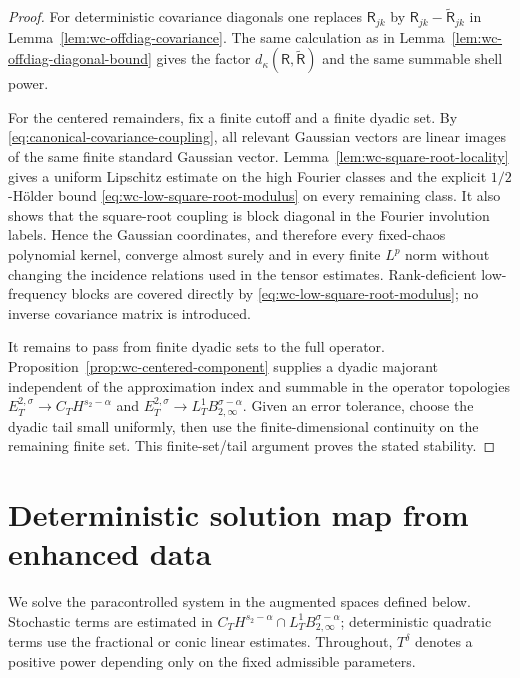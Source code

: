 \documentclass[10pt]{amsart}
\numberwithin{equation}{section}
\theoremstyle{plain}
\theoremstyle{definition}
\theoremstyle{remark}
\begin{document}
\begin{proof}
For deterministic covariance diagonals one replaces \(\mathsf R_{jk}\) by \(\mathsf R_{jk}-\widetilde{\mathsf R}_{jk}\) in Lemma~\ref{lem:wc-offdiag-covariance}.  The same calculation as in Lemma~\ref{lem:wc-offdiag-diagonal-bound} gives the factor \(d_\kappa(\mathsf R,\widetilde{\mathsf R})\) and the same summable shell power.

For the centered remainders, fix a finite cutoff and a finite dyadic set.  By \eqref{eq:canonical-covariance-coupling}, all relevant Gaussian vectors are linear images of the same finite standard Gaussian vector.  Lemma~\ref{lem:wc-square-root-locality} gives a uniform Lipschitz estimate on the high Fourier classes and the explicit $1/2$-H\"older bound \eqref{eq:wc-low-square-root-modulus} on every remaining class.  It also shows that the square-root coupling is block diagonal in the Fourier involution labels.  Hence the Gaussian coordinates, and therefore every fixed-chaos polynomial kernel, converge almost surely and in every finite $L^p$ norm without changing the incidence relations used in the tensor estimates.  Rank-deficient low-frequency blocks are covered directly by \eqref{eq:wc-low-square-root-modulus}; no inverse covariance matrix is introduced.

It remains to pass from finite dyadic sets to the full operator.  Proposition~\ref{prop:wc-centered-component} supplies a dyadic majorant independent of the approximation index and summable in the operator topologies \(E_T^{2,\sigma}\to C_TH^{s_2-\alpha}\) and \(E_T^{2,\sigma}\to L_T^1B_{2,\infty}^{\sigma-\alpha}\).  Given an error tolerance, choose the dyadic tail small uniformly, then use the finite-dimensional continuity on the remaining finite set.  This finite-set/tail argument proves the stated stability.
\end{proof}




\section{Deterministic solution map from enhanced data}\label{sec:deterministic-closure}

We solve the paracontrolled system in the augmented spaces defined below.  Stochastic terms are estimated in \(C_TH^{s_2-\alpha}\cap L_T^1B_{2,\infty}^{\sigma-\alpha}\); deterministic quadratic terms use the fractional or conic linear estimates.  Throughout, \(T^\delta\) denotes a positive power depending only on the fixed admissible parameters.
\end{document}
